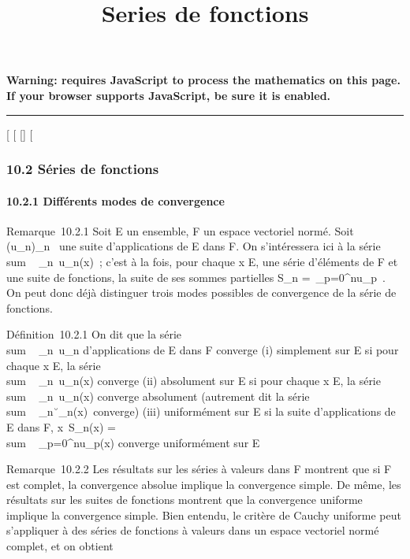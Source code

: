 \documentclass[]{article}
\title{Series de fonctions}
\author{}
\date{}
\begin{document}
\maketitle

\textbf{Warning: 
requires JavaScript to process the mathematics on this page.\\ If your
browser supports JavaScript, be sure it is enabled.}

\begin{center}\rule{3in}{0.4pt}\end{center}

[
[
[]
[

\subsubsection{10.2 Séries de fonctions}

\paragraph{10.2.1 Différents modes de convergence}

Remarque~10.2.1 Soit E un ensemble, F un espace vectoriel normé. Soit
(u_n)_n\in{}~ une suite d'applications de E dans F. On
s'intéressera ici à la série
\\sum ~
_n\in{}~u_n(x)~; c'est à la fois, pour chaque x \in E, une
série d'éléments de F et une suite de fonctions, la suite de ses sommes
partielles S_n =\
\sum  _p=0^nu_p~. On peut
donc déjà distinguer trois modes possibles de convergence de la série de
fonctions.

Définition~10.2.1 On dit que la série
\\sum ~
_n\in{}~u_n d'applications de E dans F converge (i)
simplement sur E si pour chaque x \in E, la série
\\sum ~
_n\in{}~u_n(x) converge (ii) absolument sur E si pour chaque
x \in E, la série \\sum ~
_n\in{}~u_n(x) converge absolument (autrement dit la série
\\sum ~
_n\in{}~\u_n(x)\
converge) (iii) uniformément sur E si la suite d'applications de E dans
F, x\mapsto~S_n(x)
= \\sum ~
_p=0^nu_p(x) converge uniformément sur E

Remarque~10.2.2 Les résultats sur les séries à valeurs dans F montrent
que si F est complet, la convergence absolue implique la convergence
simple. De même, les résultats sur les suites de fonctions montrent que
la convergence uniforme implique la convergence simple. Bien entendu, le
critère de Cauchy uniforme peut s'appliquer à des séries de fonctions à
valeurs dans un espace vectoriel normé complet, et on obtient
\end{document}
